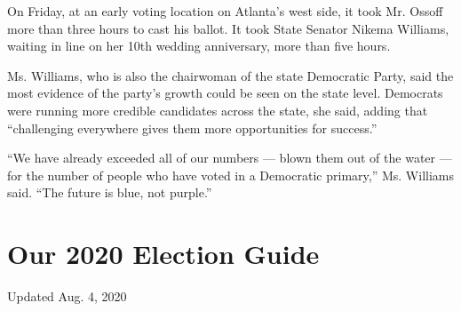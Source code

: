On Friday, at an early voting location on Atlanta's west side, it took
Mr. Ossoff more than three hours to cast his ballot. It took State
Senator Nikema Williams, waiting in line on her 10th wedding
anniversary, more than five hours.

Ms. Williams, who is also the chairwoman of the state Democratic Party,
said the most evidence of the party's growth could be seen on the state
level. Democrats were running more credible candidates across the state,
she said, adding that ``challenging everywhere gives them more
opportunities for success.''

``We have already exceeded all of our numbers --- blown them out of the
water --- for the number of people who have voted in a Democratic
primary,'' Ms. Williams said. ``The future is blue, not purple.''

\hypertarget{our-2020-election-guide}{%
\section{Our 2020 Election Guide}\label{our-2020-election-guide}}

Updated Aug. 4, 2020

